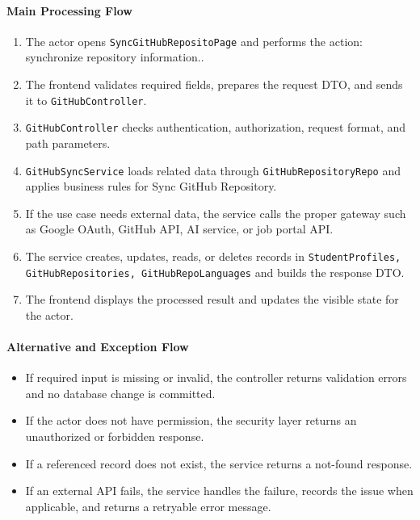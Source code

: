 \paragraph{Main Processing Flow}

\begin{enumerate}
    \item The actor opens \texttt{SyncGitHubRepositoPage} and performs the action: synchronize repository information..
    \item The frontend validates required fields, prepares the request DTO, and sends it to \texttt{GitHubController}.
    \item \texttt{GitHubController} checks authentication, authorization, request format, and path parameters.
    \item \texttt{GitHubSyncService} loads related data through \texttt{GitHubRepositoryRepo} and applies business rules for Sync GitHub Repository.
    \item If the use case needs external data, the service calls the proper gateway such as Google OAuth, GitHub API, AI service, or job portal API.
    \item The service creates, updates, reads, or deletes records in \texttt{StudentProfiles, GitHubRepositories, GitHubRepoLanguages} and builds the response DTO.
    \item The frontend displays the processed result and updates the visible state for the actor.
\end{enumerate}

\paragraph{Alternative and Exception Flow}

\begin{itemize}
    \item If required input is missing or invalid, the controller returns validation errors and no database change is committed.
    \item If the actor does not have permission, the security layer returns an unauthorized or forbidden response.
    \item If a referenced record does not exist, the service returns a not-found response.
    \item If an external API fails, the service handles the failure, records the issue when applicable, and returns a retryable error message.
\end{itemize}

